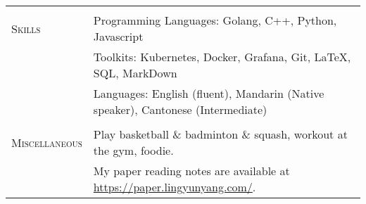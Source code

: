 \documentclass[letterpaper, 12pt]{article}
\begin{document}
\begin{longtable}{p{1.0in}p{5.8in}}

& \\

\nohyphens{\textsc{Skills}}
& Programming Languages: Golang, C++, Python, Javascript \\
& Toolkits: Kubernetes, Docker, Grafana, Git, \LaTeX, SQL, MarkDown \\
& Languages: English (fluent), Mandarin (Native speaker), Cantonese (Intermediate) \\
& \\


\nohyphens{\textsc{Miscellaneous}}
& Play basketball \& badminton \& squash, workout at the gym, foodie. \\
& My paper reading notes are available at \href{https://paper.lingyunyang.com/}{https://paper.lingyunyang.com/}. \\


\end{longtable}
\end{document}
